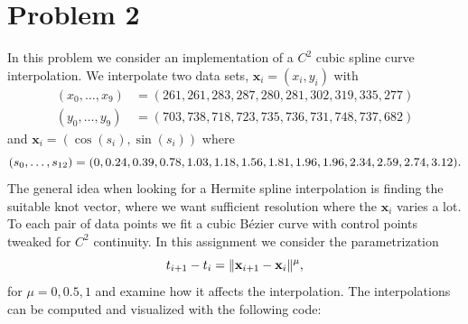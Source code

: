 \documentclass{article}
\renewcommand{\bf}[1]{\mathbf{#1}}
\begin{document}
   \section*{Problem 2}
   \label{sec:problem_2}
   
    In this problem we consider an implementation of a $C^2$ cubic spline curve
    interpolation. We interpolate two data sets, $\bf{x}_i = (x_i, y_i)$ with 
    \begin{align*}
        (x_0, \ldots, x_9) &= (261, 261, 283, 287, 280, 281, 302, 319, 335, 277)\\
        (y_0, \ldots, y_9) &= (703,738, 718, 723, 735, 736, 731, 748, 737, 682)
    \end{align*}
    and $\bf{x}_i = (\cos(s_i), \sin(s_i))$ where
    \begin{equation}
        \notag
        (s_0, \ldots, s_{12}) = (0, 0.24, 0.39, 0.78, 1.03, 1.18, 1.56, 1.81, 1.96, 1.96, 2.34, 2.59, 2.74, 3.12).
    \end{equation}
    The general idea when looking for a Hermite spline interpolation is finding
    the suitable knot vector, where we want sufficient resolution where the $
    \bf{x}_i$ varies a lot. To each pair of data points we fit a cubic B\'ezier
    curve with control points tweaked for $C^2$ continuity. In this assignment
    we consider the parametrization
    \begin{equation}
        \notag
        t_{i+1} - t_i = \| \bf{x}_{i+1} - \bf{x}_i\|^\mu,
    \end{equation}
    for $\mu = 0, 0.5, 1$ and examine how it affects the interpolation. The
    interpolations can be computed and visualized with the following code:
\end{document}
